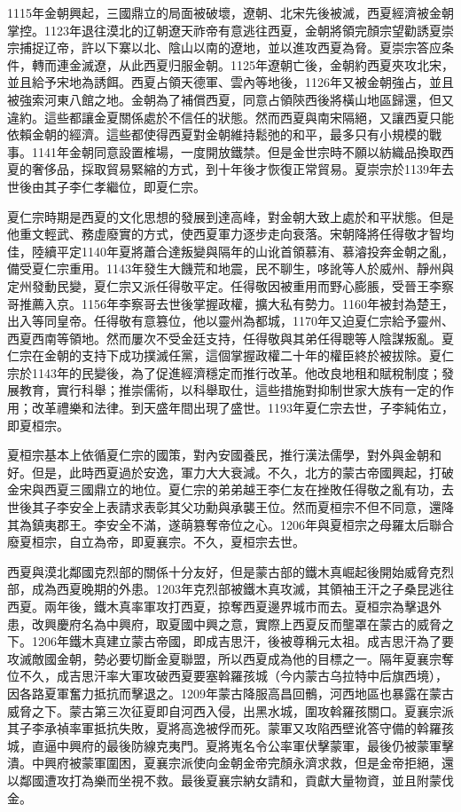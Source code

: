 1115年金朝興起，三國鼎立的局面被破壞，遼朝、北宋先後被滅，西夏經濟被金朝掌控。1123年退往漠北的辽朝遼天祚帝有意逃往西夏，金朝將領完顏宗望勸誘夏崇宗捕捉辽帝，許以下寨以北、陰山以南的遼地，並以進攻西夏為脅。夏崇宗答应条件，轉而連金滅遼，从此西夏归服金朝。1125年遼朝亡後，金朝約西夏夾攻北宋，並且給予宋地為誘餌。西夏占領天德軍、雲內等地後，1126年又被金朝強占，並且被強索河東八館之地。金朝為了補償西夏，同意占領陝西後將橫山地區歸還，但又違約。這些都讓金夏關係處於不信任的狀態。然而西夏與南宋隔絕，又讓西夏只能依賴金朝的經濟。這些都使得西夏對金朝維持鬆弛的和平，最多只有小規模的戰事。1141年金朝同意設置榷場，一度開放鐵禁。但是金世宗時不願以紡織品換取西夏的奢侈品，採取貿易緊縮的方式，到十年後才恢復正常貿易。夏崇宗於1139年去世後由其子李仁孝繼位，即夏仁宗。

夏仁宗時期是西夏的文化思想的發展到達高峰，對金朝大致上處於和平狀態。但是他重文輕武、務虛廢實的方式，使西夏軍力逐步走向衰落。宋朝降將任得敬才智均佳，陸續平定1140年夏將蕭合達叛變與隔年的山讹首領慕洧、慕濬投奔金朝之亂，備受夏仁宗重用。1143年發生大饑荒和地震，民不聊生，哆訛等人於威州、靜州與定州發動民變，夏仁宗又派任得敬平定。任得敬因被重用而野心膨脹，受晉王李察哥推薦入京。1156年李察哥去世後掌握政權，擴大私有勢力。1160年被封為楚王，出入等同皇帝。任得敬有意篡位，他以靈州為都城，1170年又迫夏仁宗給予靈州、西夏西南等領地。然而屢次不受金廷支持，任得敬與其弟任得聰等人陰謀叛亂。夏仁宗在金朝的支持下成功撲滅任黨，這個掌握政權二十年的權臣終於被拔除。夏仁宗於1143年的民變後，為了促進經濟穩定而推行改革。他改良地租和賦稅制度；發展教育，實行科舉；推崇儒術，以科舉取仕，這些措施對抑制世家大族有一定的作用；改革禮樂和法律。到天盛年間出現了盛世。1193年夏仁宗去世，子李純佑立，即夏桓宗。

夏桓宗基本上依循夏仁宗的國策，對內安國養民，推行漢法儒學，對外與金朝和好。但是，此時西夏過於安逸，軍力大大衰減。不久，北方的蒙古帝國興起，打破金宋與西夏三國鼎立的地位。夏仁宗的弟弟越王李仁友在挫敗任得敬之亂有功，去世後其子李安全上表請求表彰其父功勳與承襲王位。然而夏桓宗不但不同意，還降其為鎮夷郡王。李安全不滿，遂萌篡奪帝位之心。1206年與夏桓宗之母羅太后聯合廢夏桓宗，自立為帝，即夏襄宗。不久，夏桓宗去世。

西夏與漠北鄰國克烈部的關係十分友好，但是蒙古部的鐵木真崛起後開始威脅克烈部，成為西夏晚期的外患。1203年克烈部被鐵木真攻滅，其領袖王汗之子桑昆逃往西夏。兩年後，鐵木真率軍攻打西夏，掠奪西夏邊界城市而去。夏桓宗為擊退外患，改興慶府名為中興府，取夏國中興之意，實際上西夏反而壟罩在蒙古的威脅之下。1206年鐵木真建立蒙古帝國，即成吉思汗，後被尊稱元太祖。成吉思汗為了要攻滅敵國金朝，勢必要切斷金夏聯盟，所以西夏成為他的目標之一。隔年夏襄宗奪位不久，成吉思汗率大軍攻破西夏要塞斡羅孩城（今内蒙古乌拉特中后旗西境），因各路夏軍奮力抵抗而擊退之。1209年蒙古降服高昌回鶻，河西地區也暴露在蒙古威脅之下。蒙古第三次征夏即自河西入侵，出黑水城，圍攻斡羅孩關口。夏襄宗派其子李承禎率軍抵抗失敗，夏將高逸被俘而死。蒙軍又攻陷西壁讹答守備的斡羅孩城，直逼中興府的最後防線克夷門。夏將嵬名令公率軍伏擊蒙軍，最後仍被蒙軍擊潰。中興府被蒙軍圍困，夏襄宗派使向金朝金帝完顏永濟求救，但是金帝拒絕，還以鄰國遭攻打為樂而坐視不救。最後夏襄宗納女請和，貢獻大量物資，並且附蒙伐金。

